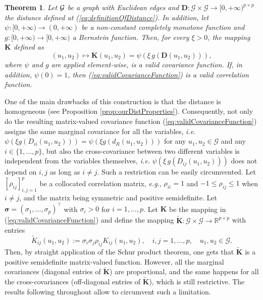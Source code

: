 \documentclass[12pt]{article}
\theoremstyle{plain}
\newtheorem{theorem}{Theorem}[section]
\theoremstyle{remark}
\newcommand{\round}[1]{\left( #1 \right)}
\newcommand{\R}[0]{\mathbb{R}}
\newcommand{\ie}{\textit{i.e. }}
\newcommand{\dVec}[1]{{\bm{#1}}}            %
\newcommand{\latMatr}[1]{\mathbf{#1}}          %
\newcommand{\tobi}[1]{\textcolor{teal}{#1}}
\begin{document}
    \begin{theorem}
        \label{theo:covFunctionBuilding}
        Let ${\cal G}$ be a graph with Euclidean edges and $\latMatr{D}: \mathcal G\times \mathcal G \to {[0,+\infty)}^{p\times p}$ the distance defined at (\ref{eq:definitionOfDistance}). In addition, let $\psi:[0,+\infty)\to (0,+\infty)$ be a non-constant completely monotone function and $g: [0,+\infty)\to [0,+\infty)$ a Bernstein function. Then, for every $ {\xi}>0$, the mapping  {$\latMatr{K}$ defined as}
        \begin{equation}
            \label{eq:validCovarianceFunction}
            (u_1,u_2)\mapsto  {\latMatr{K}(u_1,u_2)} = \psi\round{ {\xi}\,g\round{\latMatr{D}(u_1,u_2)}},
        \end{equation}
        where $\psi$ and $g$ are applied element-wise, is a valid covariance function. If, in addition, $\psi(0)=1$, then (\ref{eq:validCovarianceFunction}) is a valid correlation function.
    \end{theorem}
    One of the main drawbacks of this construction is that the distance is homogeneous (see Proposition \ref{prop:ourDistProperties}). Consequently, {not only do} the resulting {matrix-valued covariance function (\ref{eq:validCovarianceFunction}) assigns the same marginal covariance for all the variables, \ie $\psi( {\xi} g( {D_{ii}}(u_1,u_2))) = \psi( {\xi} g( {d_R}(u_1,u_2)))$ for any $u_1, u_2\in \mathcal G$ and any $i \in \{1,\ldots,p\}$}, {but also the cross-covariance between two different variables is independent from the variables themselves, \ie $\psi(\xi\, g(D_{ij}(u_1,u_2)))$ does not depend on $i,j$ as long as $i\ne j$.} %
    Such a restriction can be easily circumvented. Let $[\rho_{ij}]_{i,j=1}^p$ be a collocated correlation matrix, {\em e.g.}, $\rho_{ii}=1$ and $-1\leq \rho_{ij } \le 1$ when $i \ne j$, and the matrix being symmetric and positive semidefinite. Let $\dVec{\sigma} = (\sigma_1 ,\ldots, \sigma_p )^{\top}$ with $\sigma_i>0$ for $i=1,\ldots,p$. Let ${\latMatr{K}}$ be the mapping in (\ref{eq:validCovarianceFunction}) and define the mapping $\widetilde{{\latMatr{K}}} : \mathcal G \times \mathcal G \to \R^{p \times p}$ with entries %
    $$ \widetilde{{{K}}}_{ij}(u_1,u_2) := \sigma_i \sigma_j \rho_{ij} {{K}}_{ij}(u_1,u_2), \quad i, j = 1,\ldots,p, \quad u_1,u_2 \in \mathcal G.  $$
    Then, by straight application of the Schur product theorem, one gets that $\widetilde{{\latMatr{K}}}$ is a positive semidefinite matrix-valued function. {However, all the marginal covariances (diagonal entries of $\widetilde{{\latMatr{K}}}$) are proportional, and the same happens for all the cross-covariances (off-diagonal entries of $\widetilde{{\latMatr{K}}}$), which is still restrictive.} The results following throughout allow to circumvent such a limitation.
    
\end{document}
